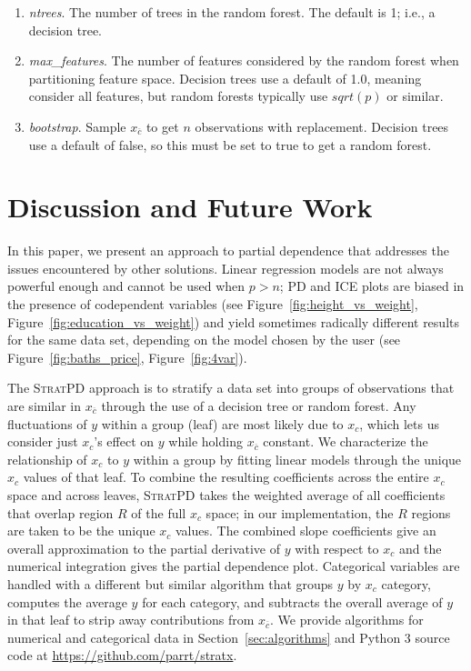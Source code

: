 \documentclass[12pt]{article}
\newcommand{\secref}[1]{Section~\ref{#1}}
\newcommand{\figref}[1]{Figure~\ref{#1}}
\newcommand{\spd}{\fontfamily{cmr}\textsc{\small StratPD}}
\newcommand{\xnc}{$x_{\overline{c}}$}
\begin{document}
\begin{enumerate}
\item {\it ntrees}. The number of trees in the random forest. The default is 1; i.e., a decision tree.
\item {\it max\_features}. The number of features considered by the random forest when partitioning feature space. Decision trees use a default of 1.0, meaning consider all features, but random forests typically use $sqrt(p)$ or similar.
\item {\it bootstrap}.  Sample \xnc{} to get $n$ observations with replacement. Decision trees use a default of false, so this must be set to true to get a random forest.
\end{enumerate}

\section{Discussion and Future Work}

In this paper, we present an approach to partial dependence that addresses the issues encountered by other solutions.  Linear regression models are not always powerful enough and cannot be used when $p>n$; PD and ICE plots are biased in the presence of codependent variables (see \figref{fig:height_vs_weight}, \figref{fig:education_vs_weight}) and yield sometimes radically different results for the same data set, depending on the model chosen by the user (see \figref{fig:baths_price}, \figref{fig:4var}).

The \spd{}  approach is to stratify a data set into groups of observations that are similar in \xnc{} through the use of a decision tree or random forest. Any fluctuations of $y$ within a group (leaf) are most likely due to $x_c$, which lets us consider just $x_c$'s effect on $y$ while holding \xnc{} constant. We characterize the relationship of $x_c$ to $y$ within a group by fitting linear models through the unique $x_c$ values of that leaf.  To combine the resulting coefficients across the entire $x_c$ space and across leaves, \spd{} takes the weighted average of all coefficients that overlap region $R$ of the full $x_c$ space; in our implementation, the $R$ regions are taken to be the unique $x_c$ values. The combined slope coefficients give an overall approximation to the partial derivative of $y$ with respect to $x_c$ and the numerical integration gives the partial dependence plot. Categorical variables are handled with a different but similar algorithm that groups $y$ by $x_c$ category, computes the average $y$ for each category, and subtracts the overall average of $y$ in that leaf to strip away contributions from \xnc. We provide algorithms for numerical and categorical data in \secref{sec:algorithms} and Python 3 source code at {\small \url{https://github.com/parrt/stratx}}.
\end{document}
